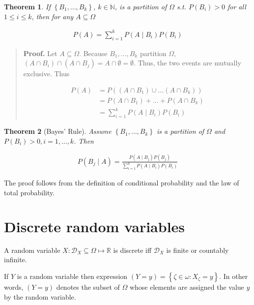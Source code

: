 \documentclass[a4paper, 12pt]{article}
\newtheorem{theorem}{Theorem}
\newtheorem{theorem}{Theorem}
\begin{document}
\begin{theorem}
    If $\left\{ B_1, \ldots, B_k \right\} $, $k \in \mathbb{N}$, is a partition
    of $\Omega$ s.t. $P(B_i) > 0$ for all $1\leq i \leq k$, then for any $A
    \subseteq \Omega$

    \begin{align*}
        P(A) = \sum_{i=1}^{k} P(A \mid B_i) P(B_i)
    \end{align*}
\end{theorem}


\small
\begin{quote}

\textbf{Proof.} Let $A \subseteq \Omega$. Because $B_1, \ldots, B_k$ partition
$\Omega$, $(A \cap B_i) \cap  (A \cap B_j) = A \cap \emptyset = \emptyset$.
Thus, the two events are mutually exclusive. Thus

\begin{align*}
    P(A) &= P \left( \left( A \cap B_1 \right) \cup \ldots \left( A \cap B_k
    \right)   \right)  \\ 
        &= P(A \cap B_1) + \ldots + P(A \cap B_k) \\ 
        &= \sum_{i=1}^{k} P(A \mid B_i)P(B_i)
\end{align*}

\end{quote}
\normalsize

\begin{theorem}[Bayes' Rule]
    Assume $\left\{ B_1, \ldots, B_k \right\} $ is a partition of $\Omega$ and
    $P(B_i) > 0, i = 1, \ldots, k$. Then 

    \begin{align*}
        P(B_j \mid A) = \frac{P(A \mid B_j) P(B_j)}{\sum_{i=1}^{k}P(A \mid
        B_i)P(B_i)}
    \end{align*}
\end{theorem}

The proof follows from the definition of conditional probability and the law of
total probability.


\section{Discrete random variables}

A random variable $X : \mathcal{D}_X \subseteq  \Omega \mapsto \mathbb{R}$ is
discrete iff $\mathcal{D}_X$ is finite or countably infinite. 

If $Y$ is a random variable then expression $(Y = y) = \left\{ \zeta \in \omega
: X_{\zeta} = y \right\} $. In other words, $(Y = y)$ denotes the subset of
$\Omega$ whose elements are assigned the value $y$ by the random variable.
\end{document}
